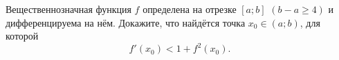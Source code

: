 \documentclass{article}
\begin{document}
Вещественнозначная функция $f$ определена на отрезке $[a;b]$ $(b-a \geqslant 4)$ и дифференцируема на нём. Докажите, что 
найдётся точка $x_0 \in (a;b)$, для которой
$$f'(x_0) < 1 + f^2(x_0).$$
\end{document}
